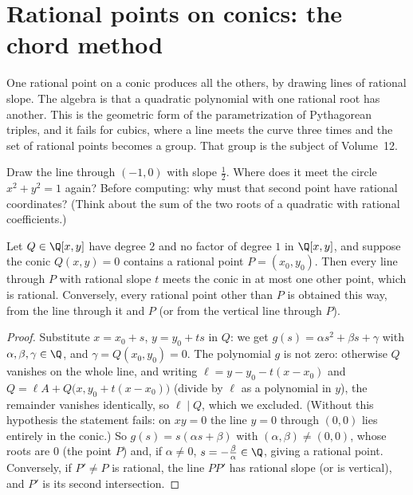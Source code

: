 \section{Rational points on conics: the chord method}

One rational point on a conic produces all the others, by drawing lines of rational slope. The algebra is that a quadratic polynomial with one rational root has another. This is the geometric form of the parametrization of Pythagorean triples, and it fails for cubics, where a line meets the curve three times and the set of rational points becomes a group. That group is the subject of Volume~12.

\begin{think}
Draw the line through $(-1,0)$ with slope $\frac12$. Where does it meet the circle $x^2+y^2=1$ again? Before computing: why must that second point have rational coordinates? (Think about the sum of the two roots of a quadratic with rational coefficients.)
\end{think}

\begin{proposition}\label{prop:chord}
Let $Q\in\Q[x,y]$ have degree $2$ and no factor of degree $1$ in $\Q[x,y]$, and suppose the conic $Q(x,y)=0$ contains a rational point $P=(x_0,y_0)$. Then every line through $P$ with rational slope $t$ meets the conic in at most one other point, which is rational. Conversely, every rational point other than $P$ is obtained this way, from the line through it and $P$ (or from the vertical line through $P$).
\end{proposition}
\begin{proof}
Substitute $x=x_0+s$, $y=y_0+ts$ in $Q$: we get $g(s)=\alpha s^2+\beta s+\gamma$ with $\alpha,\beta,\gamma\in\Q$, and $\gamma=Q(x_0,y_0)=0$. The polynomial $g$ is not zero: otherwise $Q$ vanishes on the whole line, and writing $\ell=y-y_0-t(x-x_0)$ and $Q=\ell A+Q\big(x,y_0+t(x-x_0)\big)$ (divide by $\ell$ as a polynomial in $y$), the remainder vanishes identically, so $\ell\mid Q$, which we excluded. (Without this hypothesis the statement fails: on $xy=0$ the line $y=0$ through $(0,0)$ lies entirely in the conic.) So $g(s)=s(\alpha s+\beta)$ with $(\alpha,\beta)\ne(0,0)$, whose roots are $0$ (the point $P$) and, if $\alpha\ne0$, $s=-\frac\beta\alpha\in\Q$, giving a rational point. Conversely, if $P'\ne P$ is rational, the line $PP'$ has rational slope (or is vertical), and $P'$ is its second intersection.
\end{proof}

